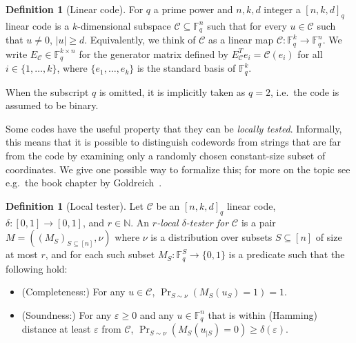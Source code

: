 \documentclass[11pt]{article}
\theoremstyle{definition}
\newtheorem{definition}[theorem]{Definition}
\newcommand{\code}{\mathcal{C}}
\newcommand{\field}{\mathbb{F}_2}
\newcommand{\N}{\ensuremath{\mathbb{N}}}
\newcommand{\F}{\ensuremath{\mathbb{F}}}
\newcommand{\mM}{\ensuremath{\mathcal{M}}}
\newcommand{\eps}{\varepsilon}
\begin{document}
\begin{definition}[Linear code]
For $q$ a prime power and $n,k,d$ integer
a $[n,k,d]_q$ linear code is a $k$-dimensional subspace $\code\subseteq \F_q^n$ such that for every $u\in \code$ such that $u\neq 0$, $|u|\geq d$. Equivalently, we think of $\code$ as a linear map $\code:\F_q^k\to \F_q^n$. We write $E_\code \in \F_q^{k\times n}$ for the generator matrix defined by $ E_\code^T e_i =\code(e_i)$ for all $i\in\{1,\ldots,k\}$, where $\{e_1,\ldots,e_k\}$ is the standard basis of $\F_q^k$. 
\end{definition}

When the subscript $q$ is omitted, it is implicitly taken as $q=2$, i.e.\ the code is assumed to be binary. 

Some codes have the useful property that they can be \emph{locally tested}. Informally, this means that it is possible to distinguish codewords from strings that are far from the code by examining only a randomly chosen constant-size subset of coordinates. We give one possible way to formalize this; for more on the topic see e.g.\ the book chapter by Goldreich~\cite{goldreich_2017}. 


\begin{definition}[Local tester]\label{def:code-test}
Let $\code$ be an $[n,k,d]_q$ linear code, $\delta:[0,1]\to[0,1]$, and $r\in \N$.
An \emph{$r$-local $\delta$-tester for $\code$} is a pair $M = ((M_S)_{S \subseteq [n]},\nu)$ where $\nu$ is a distribution over subsets $S\subseteq [n]$ of size at most $r$, and for each such subset $M_S:\F_q^S\to\{0,1\}$ is a predicate such that the following hold:
\begin{itemize} 
\item (Completeness:) For any $u\in \code$, $\Pr_{S\sim \nu}( M_S(u_S)=1)=1$.
\item (Soundness:) For any $\eps\geq 0$ and any $u\in \F_q^n$ that is within (Hamming) distance at least  $\eps$ from $\code$, $\Pr_{S\sim\nu}(M_S(u_{|S})=0)\geq \delta(\eps)$.
\end{itemize}
\end{definition}

\end{document}

